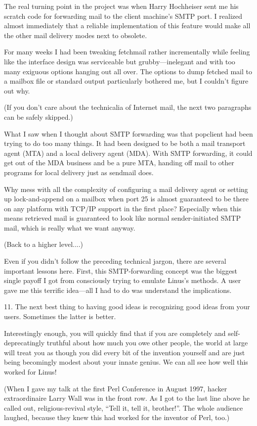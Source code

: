 \documentclass[a4paper,12pt,UTF8,twoside]{ctexbook}
\begin{document}
The real turning point in the project was when Harry Hochheiser sent me his scratch code for forwarding mail to the client machine's SMTP port. I realized almost immediately that a reliable implementation of this feature would make all the other mail delivery modes next to obsolete.

For many weeks I had been tweaking fetchmail rather incrementally while feeling like the interface design was serviceable but grubby—inelegant and with too many exiguous options hanging out all over. The options to dump fetched mail to a mailbox file or standard output particularly bothered me, but I couldn't figure out why.

(If you don't care about the technicalia of Internet mail, the next two paragraphs can be safely skipped.)

What I saw when I thought about SMTP forwarding was that popclient had been trying to do too many things. It had been designed to be both a mail transport agent (MTA) and a local delivery agent (MDA). With SMTP forwarding, it could get out of the MDA business and be a pure MTA, handing off mail to other programs for local delivery just as sendmail does.

Why mess with all the complexity of configuring a mail delivery agent or setting up lock-and-append on a mailbox when port 25 is almost guaranteed to be there on any platform with TCP/IP support in the first place? Especially when this means retrieved mail is guaranteed to look like normal sender-initiated SMTP mail, which is really what we want anyway.

(Back to a higher level....)

Even if you didn't follow the preceding technical jargon, there are several important lessons here. First, this SMTP-forwarding concept was the biggest single payoff I got from consciously trying to emulate Linus's methods. A user gave me this terrific idea—all I had to do was understand the implications.

11. The next best thing to having good ideas is recognizing good ideas from your users. Sometimes the latter is better.

Interestingly enough, you will quickly find that if you are completely and self-deprecatingly truthful about how much you owe other people, the world at large will treat you as though you did every bit of the invention yourself and are just being becomingly modest about your innate genius. We can all see how well this worked for Linus!

(When I gave my talk at the first Perl Conference in August 1997, hacker extraordinaire Larry Wall was in the front row. As I got to the last line above he called out, religious-revival style, ``Tell it, tell it, brother!''. The whole audience laughed, because they knew this had worked for the inventor of Perl, too.)
\end{document}
